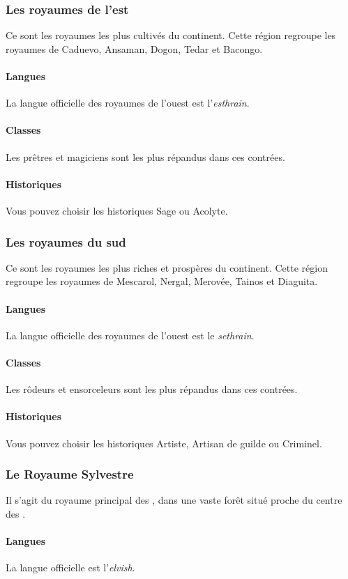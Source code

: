 \documentclass[a4paper,10pt,openany]{book}
\begin{document}
\begin{multicols}{2}
\subsubsection{Les royaumes de l’est}
Ce sont les royaumes les plus cultivés du continent. Cette région regroupe les royaumes de Caduevo, Ansaman, Dogon, Tedar et Bacongo.
\paragraph{Langues}
La langue officielle des royaumes de l’ouest est l’\emph{esthrain}.
\paragraph{Classes}
Les prêtres et magiciens sont les plus répandus dans ces contrées.
\paragraph{Historiques}
Vous pouvez choisir les historiques Sage ou Acolyte.

\subsubsection{Les royaumes du sud}
Ce sont les royaumes les plus riches et prospères du continent. Cette région regroupe les royaumes de Mescarol, Nergal, Merovée, Tainos et Diaguita.
\paragraph{Langues}
La langue officielle des royaumes de l’ouest est le \emph{sethrain}.
\paragraph{Classes}
Les rôdeurs et ensorceleurs sont les plus répandus dans ces contrées.
\paragraph{Historiques}
Vous pouvez choisir les historiques Artiste, Artisan de guilde ou Criminel.

\subsubsection{Le Royaume Sylvestre}
Il s’agit du royaume principal des \Elfes, dans une vaste forêt situé proche du centre des \Royaumes.
\paragraph{Langues}
La langue officielle est l’\emph{elvish}.

\end{multicols}
\end{document}
